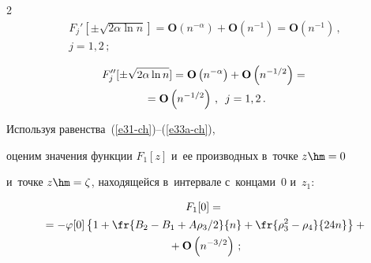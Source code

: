 \begin{multicols}{2}
\begin{multline}
F_j'[\pm\sqrt{2\alpha\ln n}]=\mathbf{O}\left(n^{-\alpha}\right)


  +\mathbf{O}\left(n^{-1}\right)=\mathbf{O}\left(n^{-1}\right)\,, \\ j=1,2\,;


 \label{e40-ch}


 \end{multline}


 


  \vspace*{-12pt}


 


 \noindent


 \begin{multline}


F_j''[\pm\sqrt{2\alpha\ln n}] =\mathbf{O}\left(n^{-\alpha}\right)


  +\mathbf{O}\left(n^{-1/2}\right)={}\\


  {}=\mathbf{O}\left(n^{-1/2}\right)\,,\enskip j=1,2\,.


 \label{e41-ch}


 \end{multline}





 Используя равенства~(\ref{e31-ch})--(\ref{e33a-ch}), 


 оценим значения функции $F_1[z]$ и~ее производных в~точке $z\hm=0$ 


 и~точке $z\hm=\zeta$, находящейся в~интервале с~концами~$0$ и~$z_{1}$:


 





 


 \noindent


 \begin{multline}


F_1[0]={}\\


{}=


  -\varphi[0]\left\{


  1+\fr{B_2-B_1+A\rho_3/2}{n}


  +\fr{\rho_3^2- \rho_4 }{24n}


  \right\}+{}\\


  {}+\mathbf{O}\left(n^{-3/2}\right)\,;



\end{multline}
\end{multicols}
